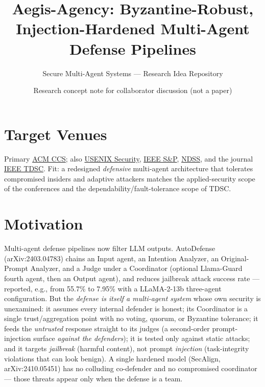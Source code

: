 \documentclass[11pt]{article}
\title{\bfseries Aegis-Agency: Byzantine-Robust, Injection-Hardened Multi-Agent Defense Pipelines}
\author{Secure Multi-Agent Systems --- Research Idea Repository}
\date{Research concept note for collaborator discussion (not a paper)}
\begin{document}
\maketitle

\section*{Target Venues}
Primary \href{https://www.sigsac.org/ccs.html}{ACM CCS}; also \href{https://www.usenix.org/conferences/byname/108}{USENIX Security}, \href{https://www.ieee-security.org/}{IEEE S\&P}, \href{https://www.ndss-symposium.org/}{NDSS}, and the journal \href{https://www.computer.org/csdl/journal/tq}{IEEE TDSC}. Fit: a redesigned \emph{defensive} multi-agent architecture that tolerates compromised insiders and adaptive attackers matches the applied-security scope of the conferences and the dependability/fault-tolerance scope of TDSC.

\section*{Motivation}
Multi-agent defense pipelines now filter LLM outputs. AutoDefense (arXiv:2403.04783) chains an Input agent, an Intention Analyzer, an Original-Prompt Analyzer, and a Judge under a Coordinator (optional Llama-Guard fourth agent, then an Output agent), and reduces jailbreak attack success rate --- reported, e.g., from 55.7\% to 7.95\% with a LLaMA-2-13b three-agent configuration. But the \emph{defense is itself a multi-agent system} whose own security is unexamined: it assumes every internal defender is honest; its Coordinator is a single trust/aggregation point with no voting, quorum, or Byzantine tolerance; it feeds the \emph{untrusted} response straight to its judges (a second-order prompt-injection surface \emph{against the defenders}); it is tested only against static attacks; and it targets \emph{jailbreak} (harmful content), not prompt \emph{injection} (task-integrity violations that can look benign). A single hardened model (SecAlign, arXiv:2410.05451) has no colluding co-defender and no compromised coordinator --- those threats appear only when the defense is a team.
\end{document}
